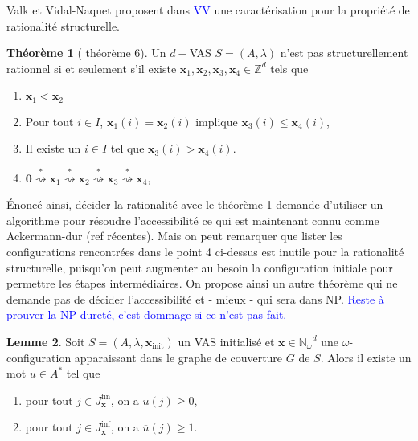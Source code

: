 \documentclass[a4paper,final]{article}
\theoremstyle{definition}
\newtheorem{Theorem}{Théorème}
\newtheorem{Lemma}[Theorem]{Lemme}
\let\leq\leqslant
\let\geq\geqslant
\newcommand{\alain}[1]{\textcolor{blue}{#1}}
\newcommand{\Z}{\ensuremath{\mathbb{Z}}}
\newcommand{\Nomega}{\ensuremath{\mathbb{N}_\omega}}
\newcommand{\transZ}[1]{\ensuremath{\stackrel{#1}{\rightsquigarrow}}}
\newcommand{\vect}[1]{\ensuremath{\mathbf{#1}}}
\newcommand{\xinit}{\ensuremath{\vect{x}_\text{init}}}
\newcommand{\valeur}[1]{\ensuremath{\overline{#1}}}
\newcommand{\Jfin}[1]{J^\text{fin}_{#1}}
\newcommand{\Jinf}[1]{J^\text{inf}_{#1}}
\begin{document}
Valk et Vidal-Naquet proposent dans \cite{vavn81} \alain{VV} une caractérisation pour la propriété de rationalité structurelle.

\begin{Theorem}[\cite{vavn81} théorème 6]
\label{rat_struct_valk}
Un $d-$VAS $S=(A,\lambda)$ n'est pas structurellement rationnel si et seulement s'il existe $\vect{x}_1, \vect{x}_2, \vect{x}_3, \vect{x}_4 \in \Z^d$ tels que 
\begin{enumerate}
    \item $\vect{x}_1 < \vect{x}_2$
    \item Pour tout $i \in I$, $\vect{x}_1(i) = \vect{x}_2(i)$ implique $\vect{x}_3(i) \leq \vect{x}_4(i)$,
    \item Il existe un $i\in I$ tel que $\vect{x}_3(i) > \vect{x}_4(i)$.
    
    \item $\vect{0} \transZ{*} \vect{x}_1 \transZ{*} \vect{x}_2 \transZ{*} \vect{x}_3 \transZ{*} \vect{x}_4$,
\end{enumerate}
\end{Theorem}


Énoncé ainsi, décider la rationalité avec le théorème \ref{rat_struct_valk} demande d'utiliser un algorithme pour résoudre l'accessibilité ce qui est maintenant connu comme Ackermann-dur (ref récentes).
Mais on peut remarquer que lister les configurations rencontrées dans le point 4 ci-dessus est inutile pour la rationalité structurelle, puisqu'on peut augmenter au besoin la configuration initiale  pour permettre les étapes intermédiaires.
On propose ainsi un autre théorème qui ne demande pas de décider l'accessibilité et - mieux - qui sera dans NP.
\alain{Reste à prouver la NP-dureté, c'est dommage si ce n'est pas fait.}


\begin{Lemma}\label{lem_access_generator}
    Soit $S=(A,\lambda,\xinit)$ un VAS initialisé et $\vect{x}\in\Nomega^d$ une $\omega$-configuration apparaissant dans le graphe de couverture $G$ de $S$.
    Alors il existe un mot $u\in A^*$ tel que
    \begin{enumerate}
        \item pour tout $j\in\Jfin{\vect{x}}$, on a $\valeur{u}(j) \geq 0$,
        \item pour tout $j\in\Jinf{\vect{x}}$, on a $\valeur{u}(j) \geq 1$.
    \end{enumerate}
\end{Lemma}
\end{document}
